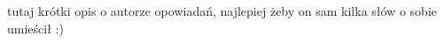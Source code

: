 \documentclass[../MAIN.tex]{subfiles}
\begin{document}
tutaj krótki opis o autorze opowiadań, najlepiej żeby on sam kilka słów o sobie umieścił :)
\end{document}
